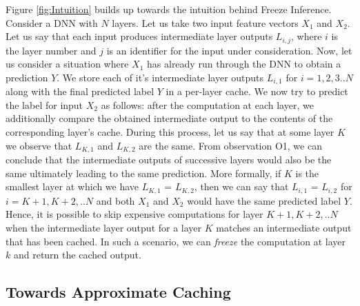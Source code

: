 \documentclass[letterpaper,twocolumn,10pt]{article}
\begin{document}
Figure \ref{fig:Intuition} builds up towards the intuition behind Freeze Inference. Consider a DNN with $N$ layers. Let us take two input feature vectors $X_{1}$ and $X_{2}$. Let us say that each input produces intermediate layer outputs $L_{i,j}$, where $i$ is the layer number and $j$ is an identifier for the input under consideration. Now, let us consider a situation where $X_{1}$ has already run through the DNN to obtain a prediction $Y$. We store each of it's intermediate layer outputs $L_{i,1}$ for $i=1,2,3..N$ along with the final predicted label $Y$ in a per-layer cache. We now try to predict the label for input $X_{2}$  as follows: after the computation at each layer, we additionally compare the obtained intermediate output to the contents of the corresponding layer's cache. During this process, let us say that at some layer $K$ we observe that $L_{K,1}$ and $L_{K,2}$ are the same. From observation O1, we can conclude that the intermediate outputs of successive layers would also be the same ultimately leading to the same prediction. More formally, if $K$ is the smallest layer at which we have $L_{K,1}$ = $L_{K,2}$, then we can say that $L_{i,1}$ = $L_{i,2}$ for $i=K+1,K+2,..N$ and both $X_{1}$ and $X_{2}$ would have the same predicted label $Y$. Hence, it is possible to skip expensive computations for layer $K+1,K+2,..N$ when the intermediate layer output for a layer $K$ matches an intermediate output that has been cached. In such a scenario, we can \textit{freeze} the computation at layer $k$ and return the cached output. \subsection{Towards Approximate Caching} \label{subsec:approx_caching}
\end{document}
